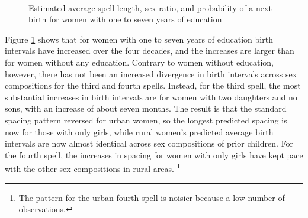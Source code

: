 \documentclass[12pt,letterpaper]{article}
\begin{document}
\begin{figure}[htpb]
\centering
{}
\\
\caption{Estimated average spell length, sex ratio, and probability of 
a next birth for women with one to seven years of education}
\label{fig:bootstrap_med}
\end{figure}


Figure \ref{fig:bootstrap_med} shows that for women with one to seven years of education
birth intervals have increased over the four decades, and the increases are larger than 
for women without any education.
Contrary to women without education, however, there has not been an increased divergence 
in birth intervals across sex compositions for the third and fourth spells.
Instead, for the third spell, the most substantial increases in birth intervals 
are for women with two daughters and no sons, with an increase of about seven months.
The result is that the standard spacing pattern reversed for urban women, so the longest 
predicted spacing is now for those with only girls, while rural women's predicted average 
birth intervals are now almost identical across sex compositions of prior children.
For the fourth spell, the increases in spacing for women with only girls have kept pace
with the other sex compositions in rural areas.%
\footnote{
The pattern for the urban fourth spell is noisier because a low number of observations.
}
\end{document}
